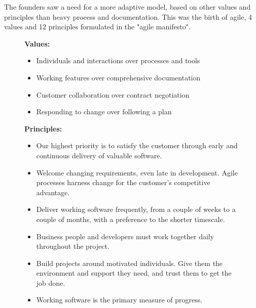 The founders saw a need for a more adaptive model, based on other values and principles than heavy process and documentation. This was the birth of agile, 4 values and 12 principles formulated in the "agile manifesto". 


\begin{figure}[h]
     \begin{minipage}[t]{0.3\textwidth}
    \textbf{Values:}
        \begin{itemize}
            \item Individuals and interactions over processes and tools
            \item Working features over comprehensive documentation
            \item Customer collaboration over contract negotiation
            \item Responding to change over following a plan
        \end{itemize}
     \end{minipage}
        \hfill
    \begin{minipage}[t]{0.3\textwidth}
        \textbf{Principles:}
        \begin{itemize}
            \item Our highest priority is to satisfy the customer
                  through early and continuous delivery
                  of valuable software.
            \item Welcome changing requirements, even late in 
                    development. Agile processes harness change for 
                    the customer's competitive advantage.
            \item Deliver working software frequently, from a 
                    couple of weeks to a couple of months, with a 
                 preference to the shorter timescale.
            \item Business people and developers must work 
                    together daily throughout the project.
            \item Build projects around motivated individuals. 
                Give them the environment and support they need, 
                and trust them to get the job done.
            \item  Working software is the primary measure of progress.
        \end{itemize}
    \end{minipage}
            \hfill
    \begin{minipage}[t]{0.3\textwidth}

\end{minipage}
\end{figure}
